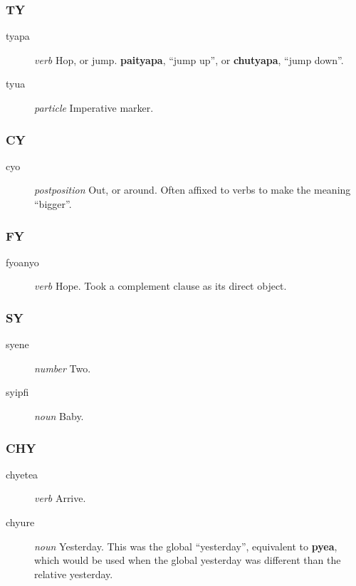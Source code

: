 \documentclass{article}
\begin{document}
\subsubsection{TY}

\begin{description}
\item [tyapa] \emph{verb} Hop, or jump.  \textbf{paityapa}, ``jump up'', or \textbf{chutyapa}, ``jump down''.
\item [tyua] \emph{particle} Imperative marker.
\end{description}

\subsubsection{CY}

\begin{description}
\item [cyo] \emph{postposition} Out, or around.  Often affixed to verbs to make the meaning ``bigger''.
\end{description}

\subsubsection{FY}

\begin{description}
\item [fyoanyo] \emph{verb} Hope.  Took a complement clause as its direct object.
\end{description}

\subsubsection{SY}

\begin{description}
\item [syene] \emph{number} Two.
\item [syipfi] \emph{noun} Baby.
\end{description}

\subsubsection{CHY}

\begin{description}
\item [chyetea] \emph{verb} Arrive.
\item [chyure] \emph{noun} Yesterday.  This was the global ``yesterday'', equivalent to \textbf{pyea}, which would be used when the global yesterday was different than the relative yesterday.
\end{description}
\end{document}

